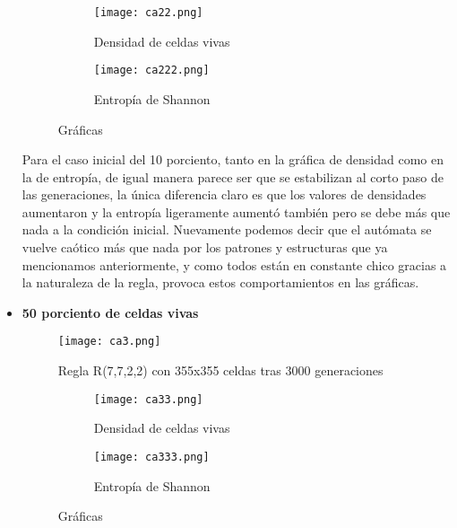 \documentclass{article}
\begin{document}
\begin{itemize}
 		\begin{figure}[htbp]
 			\centering
 			\begin{subfigure}{0.48\textwidth}
 				\centering
 				\texttt{[image: ca22.png]}
 				\caption{Densidad de celdas vivas}
 				\label{fig:A547}
 			\end{subfigure}
 			\hfill
 			\begin{subfigure}{0.48\textwidth}
 				\centering
 				\texttt{[image: ca222.png]}
 				\caption{Entropía de Shannon}
 				\label{fig:A6}
 			\end{subfigure}
 			\caption{Gráficas}
 			\label{fig:A77}
 		\end{figure}
 		
		Para el caso inicial del 10 porciento, tanto en la gráfica de densidad como en la de entropía, de igual manera parece ser que se estabilizan al corto paso de las generaciones, la única diferencia claro es que los valores de densidades aumentaron y la entropía ligeramente aumentó también pero se debe más que nada a la condición inicial. Nuevamente podemos decir que el autómata se vuelve caótico más que nada por los patrones y estructuras que ya mencionamos anteriormente, y como todos están en constante chico gracias a la naturaleza de la regla, provoca estos comportamientos en las gráficas.
 		
 		\vspace{300pt}
 		\item \textbf{50 porciento de celdas vivas}
 		 
 		\begin{figure}[htbp]
 			\centering       
 			\texttt{[image: ca3.png]}
 			\caption{Regla R(7,7,2,2) con 355x355 celdas tras 3000 generaciones}
 			\label{fig:300} 
 		\end{figure}
 		
 		\begin{figure}[htbp]
 			\centering
 			\begin{subfigure}{0.48\textwidth}
 				\centering
 				\texttt{[image: ca33.png]}
 				\caption{Densidad de celdas vivas}
 				\label{fig:A547}
 			\end{subfigure}
 			\hfill
 			\begin{subfigure}{0.48\textwidth}
 				\centering
 				\texttt{[image: ca333.png]}
 				\caption{Entropía de Shannon}
 				\label{fig:A6}
 			\end{subfigure}
 			\caption{Gráficas}
 			\label{fig:A77}
 		\end{figure}
 		

\end{itemize}
\end{document}
